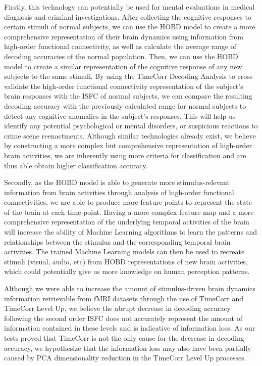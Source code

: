 \documentclass[11pt]{article}
\begin{document}
Firstly, this technology can potentially be used for mental evaluations in medical diagnosis and criminal investigations. After collecting the cognitive responses to certain stimuli of normal subjects, we can use the HOBD model to create a more comprehensive representation of their brain dynamics using information from high-order functional connectivity, as well as calculate the average range of decoding accuracies of the normal population. Then, we can use the HOBD model to create a similar representation of the cognitive response of any new subjects to the same stimuli. By using the TimeCorr Decoding Analysis to cross validate the high-order functional connectivity representation of the subject's brain responses with the ISFC of normal subjects, we can compare the resulting decoding accuracy with the previously calculated range for normal subjects to detect any cognitive anomalies in the subject's responses. This will help us identify any potential psychological or mental disorders, or suspicious reactions to crime scene reenactments. Although similar technologies already exist, we believe by constructing a more complex but comprehensive representation of high-order brain activities, we are inherently using more criteria for classification and are thus able obtain higher classification accuracy.

Secondly, as the HOBD model is able to generate more stimulus-relevant information from brain activities through analysis of high-order functional connectivities, we are able to produce more feature points to represent the state of the brain at each time point. Having a more complex feature map and a more comprehensive representation of the underlying temporal activities of the brain will increase the ability of Machine Learning algorithms to learn the patterns and relationships between the stimulus and the corresponding temporal brain activities. The trained Machine Learning models can then be used to recreate stimuli (visual, audio, etc) from HOBD representations of new brain activities, which could potentially give us more knowledge on human perception patterns.

Although we were able to increase the amount of stimulus-driven brain dynamics information retrievable from fMRI datasets through the use of TimeCorr and TimeCorr Level Up, we believe the abrupt decrease in decoding accuracy following the second order ISFC does not accurately represent the amount of information contained in these levels and is indicative of information loss. As our tests proved that TimeCorr is not the only cause for the decrease in decoding accuracy, we hypothesize that the information loss may also have been partially caused by PCA dimensionality reduction in the TimeCorr Level Up processes.
\end{document}
